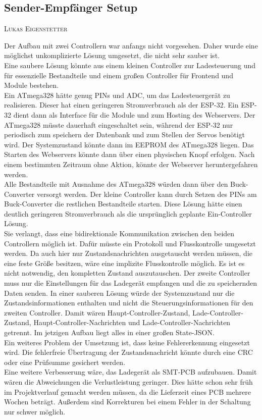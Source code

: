 \documentclass[12pt,a4paper,bibliography=totocnumbered,listof=totocnumbered]{article}
\makeatletter
\newcommand{\chapterauthor}[1]{%
  {\parindent0pt\vspace*{-5pt}%
  \linespread{1.1}\small\scshape#1%
  \par\nobreak\vspace*{3pt}}
  \@afterheading%
}
\makeatother
\begin{document}
\subsection{Sender-Empfänger Setup}\label{KommunikationVerbesserung}
\chapterauthor{Lukas Eigenstetter}
Der Aufbau mit zwei Controllern war anfangs nicht vorgesehen.
Daher wurde eine möglichst unkomplizierte Lösung umgesetzt, die nicht sehr sauber ist.\\
Eine saubere Lösung könnte aus einem kleinen Controller zur Ladesteuerung und für essenzielle Bestandteile und einem großen Controller für Frontend und Module bestehen.\\
Ein ATmega328 hätte genug PINs und ADC, um das Ladesteuergerät zu realisieren.
Dieser hat einen geringeren Stromverbrauch als der ESP-32.
Ein ESP-32 dient dann als Interface für die Module und zum Hosting des Webservers.
Der ATmega328 müsste dauerhaft eingeschaltet sein, während der ESP-32 nur periodisch zum speichern der Datenbank und zum Stellen der Servos benötigt wird.
Der Systemzustand könnte dann im EEPROM des ATmega328 liegen.
Das Starten des Webservers könnte dann über einen physischen Knopf erfolgen.
Nach einem bestimmten Zeitraum ohne Aktion, könnte der Webserver heruntergefahren werden.\\
Alle Bestandteile mit Ausnahme des ATmega328 würden dann über den Buck-Converter versorgt werden.
Der kleine Controller kann durch Setzen des PINs am Buck-Converter die restlichen Bestandteile starten.
Diese Lösung hätte einen deutlich geringeren Stromverbrauch als die ursprünglich geplante Ein-Controller Lösung.\\
Sie verlangt, dass eine bidirektionale Kommunikation zwischen den beiden Controllern möglich ist.
Dafür müsste ein Protokoll und Flusskontrolle umgesetzt werden.
Da auch hier nur Zustandsnachrichten ausgetauscht werden müssen, die eine feste Größe besitzen, wäre eine implizite Flusskontrolle möglich.
Es ist es nicht notwendig, den kompletten Zustand auszutauschen.
Der zweite Controller muss nur die Einstellungen für das Ladegerät empfangen und die zu speichernden Daten senden.
In einer sauberen Lösung würde der Systemzustand nur die Zustandsinformationen enthalten und nicht die Steuerungsinformationen für den zweiten Controller.
Damit wären Haupt-Controller-Zustand, Lade-Controller-Zustand, Haupt-Controller-Nachrichten und Lade-Controller-Nachrichten getrennt.
Im jetzigen Aufbau liegt alles in einer großen State-JSON.\\
Ein weiteres Problem der Umsetzung ist, dass keine Fehlererkennung eingesetzt wird.
Die fehlerfreie Übertragung der Zustandsnachricht könnte durch eine CRC oder eine Prüfsumme gesichert werden.\\
Eine weitere Verbesserung wäre, das Ladegerät als SMT-PCB aufzubauen.
Damit wären die Abweichungen die Verlustleistung geringer.
Dies hätte schon sehr früh im Projektverlauf gemacht werden müssen, da die Lieferzeit eines PCB mehrere Wochen beträgt.
Außerdem sind Korrekturen bei einem Fehler in der Schaltung nur schwer möglich.
\end{document}
